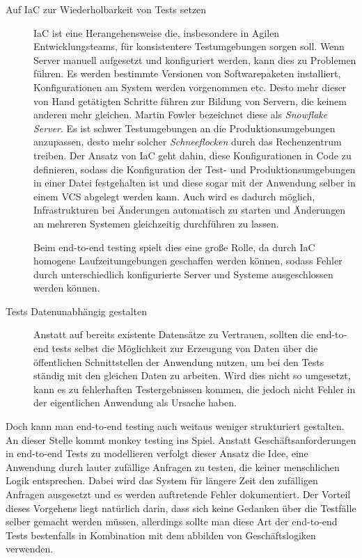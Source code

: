 \documentclass[12pt,a4paper,bibliography=totocnumbered,listof=totocnumbered]{scrartcl}
\begin{document}
\begin{description}
	\item[Auf \ac{IaC} zur Wiederholbarkeit von Tests setzen] \ac{IaC} ist eine Herangehensweise die, insbesondere in Agilen Entwicklungsteams, für konsistentere Testumgebungen sorgen soll. Wenn Server manuell aufgesetzt und konfiguriert werden, kann dies zu Problemen führen. Es werden bestimmte Versionen von Softwarepaketen installiert, Konfigurationen am System werden vorgenommen etc. Desto mehr dieser von Hand getätigten Schritte führen zur Bildung von Servern, die keinem anderen mehr gleichen. Martin  Fowler bezeichnet diese als \textit{Snowflake Server}\cite{fowlersnow}. Es ist schwer Testumgebungen an die Produktionsumgebungen anzupassen, desto mehr solcher \textit{Schneeflocken} durch das Rechenzentrum treiben. Der Ansatz von \ac{IaC} geht dahin, diese Konfigurationen in Code zu definieren, sodass die Konfiguration der Test- und Produktionsumgebungen in einer Datei festgehalten ist und diese sogar mit der Anwendung selber in einem \acs{VCS} abgelegt werden kann. Auch wird es dadurch möglich, Infrastrukturen bei Änderungen automatisch zu starten und Änderungen an mehreren Systemen gleichzeitig durchführen zu lassen.\cite{fowlersnow}
	
	Beim end-to-end testing spielt dies eine große Rolle, da durch \ac{IaC} homogene Laufzeitumgebungen geschaffen werden können, sodass Fehler durch unterschiedlich konfigurierte Server und Systeme ausgeschlossen werden können.\cite{clemson}
	
	\item[Tests Datenunabhängig gestalten] Anstatt auf bereits existente Datensätze zu Vertrauen, sollten die end-to-end tests selbst die Möglichkeit zur Erzeugung von Daten über die öffentlichen Schnittstellen der Anwendung nutzen, um bei den Tests ständig mit den gleichen Daten zu arbeiten. Wird dies nicht so umgesetzt, kann es zu fehlerhaften Testergebnissen kommen, die jedoch nicht Fehler in der eigentlichen Anwendung als Ursache haben.\cite{clemson}
\end{description}

Doch kann man end-to-end testing auch weitaus weniger strukturiert gestalten. An dieser Stelle kommt monkey testing ins Spiel. Anstatt Geschäftsanforderungen in end-to-end Tests zu modellieren verfolgt dieser Ansatz die Idee, eine Anwendung durch lauter zufällige Anfragen zu testen, die keiner menschlichen Logik entsprechen. Dabei wird das System für längere Zeit den zufälligen Anfragen ausgesetzt und es werden auftretende Fehler dokumentiert. Der Vorteil dieses Vorgehens liegt natürlich darin, dass sich keine Gedanken über die Testfälle selber gemacht werden müssen, allerdings sollte man diese Art der end-to-end Tests bestenfalls in Kombination mit dem abbilden von Geschäftslogiken verwenden.
\end{document}
